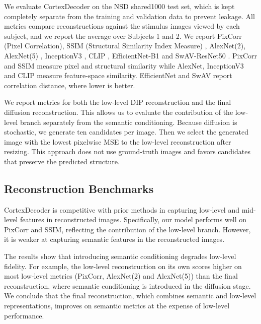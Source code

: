 We evaluate CortexDecoder on the NSD shared1000 test set, which is kept completely separate from the training and validation data to prevent leakage. All metrics compare reconstructions against the stimulus images viewed by each subject, and we report the average over Subjects 1 and 2. We report PixCorr (Pixel Correlation), SSIM (Structural Similarity Index Measure) \cite{1284395}, AlexNet(2), AlexNet(5) \cite{NIPS2012_c399862d}, InceptionV3 \cite{szegedy2015rethinkinginceptionarchitecturecomputer}, CLIP \cite{radford2021learningtransferablevisualmodels}, EfficientNet-B1 \cite{tan2020efficientnetrethinkingmodelscaling} and SwAV-ResNet50 \cite{caron2021unsupervisedlearningvisualfeatures}. PixCorr and SSIM measure pixel and structural similarity while AlexNet, InceptionV3 and CLIP measure feature-space similarity. EfficientNet and SwAV report correlation distance, where lower is better.

We report metrics for both the low-level DIP reconstruction and the final diffusion reconstruction. This allows us to evaluate the contribution of the low-level branch separately from the semantic conditioning. Because diffusion is stochastic, we generate ten candidates per image. Then we select the generated image with the lowest pixelwise MSE to the low-level reconstruction after resizing. This approach does not use ground-truth images and favors candidates that preserve the predicted structure.

\subsection{Reconstruction Benchmarks}
CortexDecoder is competitive with prior methods in capturing low-level and mid-level features in reconstructed images. Specifically, our model performs well on PixCorr and SSIM, reflecting the contribution of the low-level branch. However, it is weaker at capturing semantic features in the reconstructed images.

The results show that introducing semantic conditioning degrades low-level fidelity. For example, the low-level reconstruction on its own scores higher on most low-level metrics (PixCorr, AlexNet(2) and AlexNet(5)) than the final reconstruction, where semantic conditioning is introduced in the diffusion stage. We conclude that the final reconstruction, which combines semantic and low-level representations, improves on semantic metrics at the expense of low-level performance.


